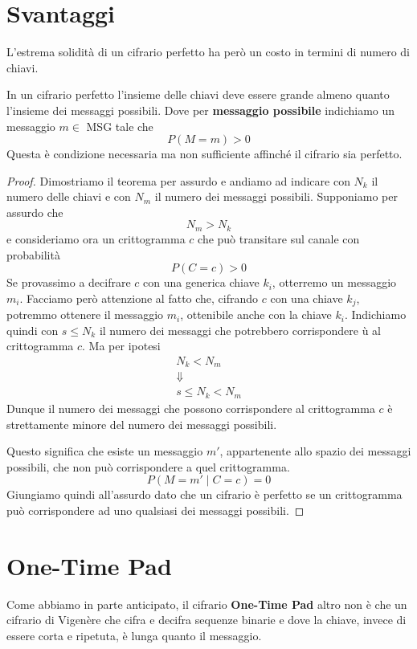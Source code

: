 \section{Svantaggi}\label{svantaggi_perfetti}
L'estrema solidit\`a di un cifrario perfetto ha per\`o un costo in termini di numero di chiavi.

\begin{theorem}[Shannon]
	In un cifrario perfetto l'insieme delle chiavi deve essere grande almeno quanto l'insieme dei messaggi possibili.
	Dove per \textbf{messaggio possibile} indichiamo un messaggio $m \in$ MSG tale che
	\[ P(M = m) > 0 \]
	Questa \`e condizione necessaria ma non sufficiente affinch\'e il cifrario sia perfetto.
	\begin{proof}
		Dimostriamo il teorema per assurdo e andiamo ad indicare con $N_k$ il numero delle chiavi e con $N_m$ il numero
		dei messaggi possibili. Supponiamo per assurdo che
		\[ N_m > N_k \]
		e consideriamo ora un crittogramma $c$ che pu\`o transitare sul canale con probabilit\`a
		\[ P(C = c) > 0 \]
		Se provassimo a decifrare $c$ con una generica chiave $k_i$, otterremo un messaggio $m_i$. Facciamo per\`o
		attenzione al fatto che, cifrando $c$ con una chiave $k_j$, potremmo ottenere il messaggio $m_i$, ottenibile
		anche con la chiave $k_i$. Indichiamo quindi con $s \leq N_k$ il numero dei messaggi che potrebbero corrispondere ù
		al crittogramma $c$. Ma per ipotesi
		\begin{gather*}
			N_k < N_m \\
			\Downarrow \\
			s \leq N_k < N_m
		\end{gather*}
		Dunque il numero dei messaggi che possono corrispondere al crittogramma $c$ \`e strettamente minore	del numero
		dei messaggi possibili.

		Questo significa che esiste un messaggio $m'$, appartenente allo spazio dei messaggi possibili, che non pu\`o
		corrispondere a quel crittogramma.
		\[ P(M = m' \mid C = c) = 0 \]
		Giungiamo quindi all'assurdo dato che un cifrario \`e perfetto se un crittogramma pu\`o corrispondere ad uno
		qualsiasi dei messaggi possibili.
	\end{proof}
\end{theorem}

\section{One-Time Pad}\label{one_time_pad}
Come abbiamo in parte anticipato, il cifrario \textbf{One-Time Pad} altro non \`e che un cifrario di Vigen\`ere che
cifra e decifra sequenze binarie e dove la chiave, invece di essere corta e ripetuta, \`e lunga quanto il messaggio.

